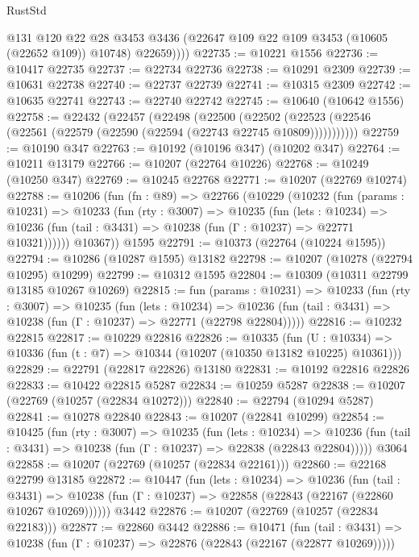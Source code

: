 \begin{lexlean}{RustStd}
\begin{coremodule}
            @131
            @120
            @22
            @28
            @3453
            @3436
            (@22647 @109 @22 @109 @3453 (@10605 (@22652 @109)) @10748)
            @22659))))
@22735 := @10221 @1556
@22736 := @10417 @22735
@22737 := @22734 @22736
@22738 := @10291 @2309
@22739 := @10631 @22738
@22740 := @22737 @22739
@22741 := @10315 @2309
@22742 := @10635 @22741
@22743 := @22740 @22742
@22745 := @10640 (@10642 @1556)
@22758 := @22432
    (@22457
      (@22498
        (@22500
          (@22502 (@22523 (@22546 (@22561 (@22579 (@22590 (@22594 (@22743 @22745 @10809)))))))))))
@22759 := @10190 @347
@22763 := @10192 (@10196 @347) (@10202 @347)
@22764 := @10211 @13179
@22766 := @10207 (@22764 @10226)
@22768 := @10249 (@10250 @347)
@22769 := @10245 @22768
@22771 := @10207 (@22769 @10274)
@22788 := @10206
    (fun (fn : @89) =>
    @22766
      (@10229
        (@10232
          (fun (params : @10231) =>
          @10233
            (fun (rty : @3007) =>
            @10235
              (fun (lets : @10234) =>
              @10236 (fun (tail : @3431) => @10238 (fun (Γ : @10237) => @22771 @10321))))))
        @10367))
    @1595
@22791 := @10373 (@22764 (@10224 @1595))
@22794 := @10286 (@10287 @1595) @13182
@22798 := @10207 (@10278 (@22794 @10295) @10299)
@22799 := @10312 @1595
@22804 := @10309 (@10311 @22799 @13185 @10267 @10269)
@22815 := fun (params : @10231) =>
  @10233
    (fun (rty : @3007) =>
    @10235
      (fun (lets : @10234) =>
      @10236 (fun (tail : @3431) => @10238 (fun (Γ : @10237) => @22771 (@22798 @22804)))))
@22816 := @10232 @22815
@22817 := @10229 @22816
@22826 := @10335
    (fun (U : @10334) => @10336 (fun (t : @7) => @10344 (@10207 (@10350 @13182 @10225) @10361)))
@22829 := @22791 (@22817 @22826) @13180
@22831 := @10192 @22816 @22826
@22833 := @10422 @22815 @5287
@22834 := @10259 @5287
@22838 := @10207 (@22769 (@10257 (@22834 @10272)))
@22840 := @22794 (@10294 @5287)
@22841 := @10278 @22840
@22843 := @10207 (@22841 @10299)
@22854 := @10425
    (fun (rty : @3007) =>
    @10235
      (fun (lets : @10234) =>
      @10236 (fun (tail : @3431) => @10238 (fun (Γ : @10237) => @22838 (@22843 @22804)))))
    @3064
@22858 := @10207 (@22769 (@10257 (@22834 @22161)))
@22860 := @22168 @22799 @13185
@22872 := @10447
    (fun (lets : @10234) =>
    @10236
      (fun (tail : @3431) =>
      @10238 (fun (Γ : @10237) => @22858 (@22843 (@22167 (@22860 @10267 @10269))))))
    @3442
@22876 := @10207 (@22769 (@10257 (@22834 @22183)))
@22877 := @22860 @3442
@22886 := @10471
    (fun (tail : @3431) => @10238 (fun (Γ : @10237) => @22876 (@22843 (@22167 (@22877 @10269)))))

\end{coremodule}
\end{lexlean}
